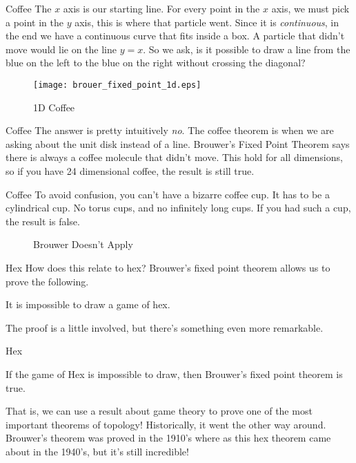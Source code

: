 \documentclass{beamer}
\begin{document}
    \begin{frame}{Coffee}
        The $x$ axis is our starting line. For every point in the $x$ axis, we must
        pick a point in the $y$ axis, this is where that particle went. Since it is
        \textit{continuous}, in the end we have a continuous curve that fits inside
        a box. A particle that didn't move would lie on the line $y=x$. So we ask,
        is it possible to draw a line from the blue on the left to the blue on the
        right without crossing the diagonal?
        \begin{figure}
            \centering
            \texttt{[image: brouer\_fixed\_point\_1d.eps]}
            \caption{1D Coffee}
            \label{fig:brouer_fixed_point_1d}
        \end{figure}
    \end{frame}
    \begin{frame}{Coffee}
        The answer is pretty intuitively \textit{no}. The coffee theorem
        is when we are asking about the unit disk instead of a line.
        Brouwer's Fixed Point Theorem says there is always a coffee molecule
        that didn't move. This hold for all dimensions, so if you have
        24 dimensional coffee, the result is still true.
    \end{frame}
    \begin{frame}{Coffee}
        To avoid confusion, you can't have a bizarre coffee cup. It has
        to be a cylindrical cup. No torus cups, and no infinitely long cups.
        If you had such a cup, the result is false.
        \begin{figure}
            \centering
            \caption{Brouwer Doesn't Apply}
            \label{fig:brouwer_bad}
        \end{figure}
    \end{frame}
    \begin{frame}{Hex}
        How does this relate to hex? Brouwer's fixed point theorem allows us to
        prove the following.
        \begin{theorem}
            It is impossible to draw a game of hex.
        \end{theorem}
        The proof is a little involved, but there's something even more remarkable.
    \end{frame}
    \begin{frame}{Hex}
        \begin{theorem}
            If the game of Hex is impossible to draw, then
            Brouwer's fixed point theorem is true.
        \end{theorem}
        That is, we can use a result about game theory to prove one of
        the most important theorems of topology! Historically, it went the
        other way around. Brouwer's theorem was proved in the 1910's where as this hex
        theorem came about in the 1940's, but it's still incredible!
    \end{frame}
\end{document}
